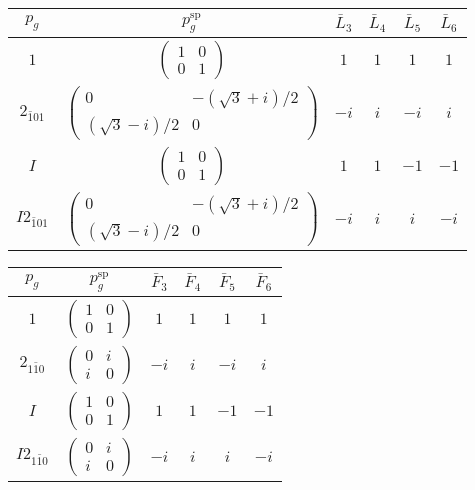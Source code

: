 \documentclass[3p,preprint]{elsarticle}
\begin{document}
\begin{table}[H]
	\begin{tabular}{|c|c||c|c|c|c|} \hline
		$p_g$ & $p_g^{\text{sp}}$ & $\bar{L}_3$ & $\bar{L}_4$ & $\bar{L}_5$ & $\bar{L}_6$  \\ \hline \hline
		$1$ & 					$\left(\begin{array}{cc} 1&0 \\ 0&1 \end{array}\right)$ &$1$ &  $1$ &  $1$ &  $1$  \\ \hline
		$2_{\bar{1}01}$ &		$\left(\begin{array}{cc} 0&-(\sqrt{3}+i)/2 \\ (\sqrt{3}-i)/2&0 \end{array}\right)$ &$-i$ & $i$ & $-i$ & $i$ \\ \hline
		$I$ & 					$\left(\begin{array}{cc} 1&0 \\ 0&1 \end{array}\right)$ &$1$ & $1$ & $-1$ & $-1$ \\ \hline
		$I2_{\bar{1}01}$ &		$\left(\begin{array}{cc} 0&-(\sqrt{3}+i)/2 \\ (\sqrt{3}-i)/2&0 \end{array}\right)$ &$-i$ & $i$ & $i$ & $-i$ \\ \hline
	\end{tabular}
\end{table}

\begin{table}[H]
	\begin{tabular}{|c|c||c|c|c|c|} \hline
		$p_g$ & $p_g^{\text{sp}}$ & $\bar{F}_3$ & $\bar{F}_4$ & $\bar{F}_5$ & $\bar{F}_6$  \\ \hline \hline
		$1$ & 							$\left(\begin{array}{cc} 1&0 \\ 0&1 \end{array}\right)$ & $1$ &  $1$ &  $1$ &  $1$  \\ \hline
		$2_{1\bar{1}0}$ &					$\left(\begin{array}{cc} 0&i \\ i&0 \end{array}\right)$ & $-i$ & $i$ & $-i$ & $i$ \\ \hline
		$I$ & 							$\left(\begin{array}{cc} 1&0 \\ 0&1 \end{array}\right)$ & $1$ & $1$ & $-1$ & $-1$ \\ \hline
		$I2_{1\bar{1}0}$ &					$\left(\begin{array}{cc} 0&i \\ i&0 \end{array}\right)$ & $-i$ & $i$ & $i$ & $-i$ \\ \hline
	\end{tabular}
\end{table}
\end{document}
